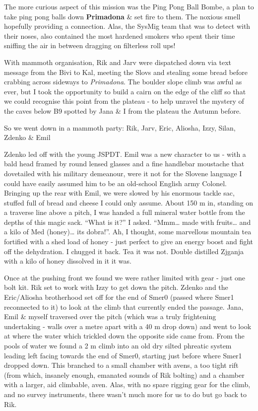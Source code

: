The more curious aspect of this mission was the Ping Pong Ball Bombe, a
plan to take ping pong balls down \textbf{Primadona} \& set fire to
them. The noxious smell hopefully providing a connection. Alas, the
SysMig team that was to detect with their noses, also contained the most
hardened smokers who spent their time sniffing the air in between
dragging on filterless roll ups!

With mammoth organisation, Rik and Jarv were dispatched down via text
message from the Bivi to Kal, meeting the Slovs and stealing some bread
before crabbing across sideways to \emph{Primadona}. The boulder slope
climb was awful as ever, but I took the opportunity to build a cairn on
the edge of the cliff so that we could recognise this point from the
plateau - to help unravel the mystery of the caves below B9 spotted by
Jana \& I from the plateau the Autumn before.

So we went down in a mammoth party: Rik, Jarv, Eric, Aliosha, Izzy,
Silan, Zdenko \& Emil

Zdenko led off with the young JSPDT. Emil was a new character to us -
with a bald head framed by round lensed glasses and a fine handlebar
moustache that dovetailed with his military demeanour, were it not for
the Slovene language I could have easily assumed him to be an old-school
English army Colonel. Bringing up the rear with Emil, we were slowed by
his enormous tackle sac, stuffed full of bread and cheese I could only
assume. About 150 m in, standing on a traverse line above a pitch, I was
handed a full mineral water bottle from the depths of this magic sack.
``What is it?'' I asked. ``Mmm\ldots{} made with fruits\ldots{} and a
kilo of Med (honey)\ldots{} its dobra!''. Ah, I thought, some marvellous
mountain tea fortified with a shed load of honey - just perfect to give
an energy boost and fight off the dehydration. I chugged it back. Tea it
was not. Double distilled Zjganja with a kilo of honey dissolved in it
it was.

Once at the pushing front we found we were rather limited with gear -
just one bolt kit. Rik set to work with Izzy to get down the pitch.
Zdenko and the Eric/Aliosha brotherhood set off for the end of Smer0
(passed where Smer1 reconnected to it) to look at the climb that
currently ended the passage. Jana, Emil \& myself traversed over the
pitch (which was a truly frightening undertaking - walls over a metre
apart with a 40 m drop down) and went to look at where the water which
trickled down the opposite side came from. From the pools of water we
found a 2 m climb into an old dry silted phreatic system leading left
facing towards the end of Smer0, starting just before where Smer1
dropped down. This branched to a small chamber with avens, a too tight
rift (from which, insanely enough, emanated sounds of Rik bolting) and a
chamber with a larger, aid climbable, aven. Alas, with no spare rigging
gear for the climb, and no survey instruments, there wasn't much more
for us to do but go back to Rik.

